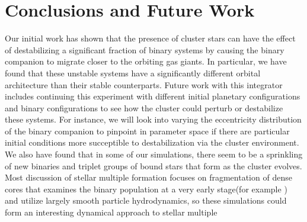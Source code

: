 \documentclass{aastex631}
\begin{document}
\section{Conclusions and Future Work}
Our initial work has shown that the presence
of cluster stars can have the effect of destabilizing a significant fraction of binary systems by causing the binary companion to migrate closer to the orbiting gas giants.
In particular, we have found that these unstable systems have a significantly different orbital architecture than their stable counterparts. 
Future work with this integrator includes continuing this experiment with different initial planetary configurations and binary configurations to see how the cluster could
perturb or destabilize these systems. For instance, we will look into varying the eccentricity distribution of the binary companion to pinpoint in parameter space
if there are particular initial conditions more succeptible to destabilization via the cluster environment.
We also have found that in some of our simulations, there seem to be a sprinkling of new binaries and triplet groups of bound stars that form as the cluster evolves. 
Most discussion of stellar multiple formation focuses on fragmentation of dense cores that examines the binary population
at a very early stage(for example \cite{bon94}) and utilize largely smooth particle hydrodynamics, so these simulations could form an interesting dynamical approach to stellar multiple
\end{document}
